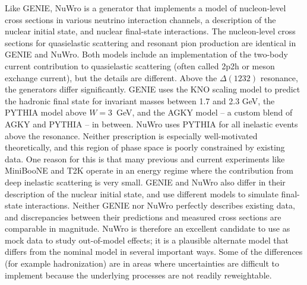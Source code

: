 \documentclass[11pt]{article}
\begin{document}
Like GENIE, NuWro is a generator that implements a model of nucleon-level cross sections in various neutrino interaction channels, a description of the nuclear initial state, and nuclear final-state interactions. The nucleon-level cross sections for quasielastic scattering and resonant pion production are identical in GENIE and NuWro. Both models include an implementation of the two-body current contribution to quasielastic scattering (often called 2p2h or meson exchange current), but the details are different. Above the $\Delta(1232)$ resonance, the generators differ significantly. GENIE uses the KNO scaling model to predict the hadronic final state for invariant masses between 1.7 and 2.3 GeV, the PYTHIA model above $W = 3$~GeV, and the AGKY model -- a custom blend of AGKY and PYTHIA -- in between. NuWro uses PYTHIA for all inelastic events above the resonance. Neither prescription is especially well-motivated theoretically, and this region of phase space is poorly constrained by existing data. One reason for this is that many previous and current experiments like MiniBooNE and T2K operate in an energy regime where the contribution from deep inelastic scattering is very small. GENIE and NuWro also differ in their description of the nuclear initial state, and use different models to simulate final-state interactions. Neither GENIE nor NuWro perfectly describes existing data, and discrepancies between their predictions and measured cross sections are comparable in magnitude. NuWro is therefore an excellent candidate to use as mock data to study out-of-model effects; it is a plausible alternate model that differs from the nominal model in several important ways. Some of the differences (for example hadronization) are in areas where uncertainties are difficult to implement because the underlying processes are not readily reweightable.
\end{document}
